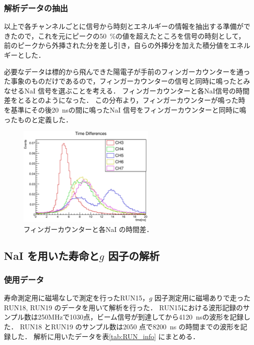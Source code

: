 \subsubsection{解析データの抽出}
以上で各チャンネルごとに信号から時刻とエネルギーの情報を抽出する準備ができたので，これを元にピークの50~\%の値を超えたところを信号の時刻として，前のピークから外挿された分を差し引き，自らの外挿分を加えた積分値をエネルギーとした．

必要なデータは標的から飛んできた陽電子が手前のフィンガーカウンターを通った事象のものだけであるので，フィンガーカウンターの信号と同時に鳴ったとみなせるNaI 信号を選ぶことを考える．
フィンガーカウンターと各NaI信号の時間差をとるとのようになった．
この分布より，フィンガーカウンターが鳴った時を基準にその後20~nsの間に鳴ったNaI 信号をフィンガーカウンターと同時に鳴ったものと定義した．

\begin{figure}[hbt]
\centering
\includegraphics[width=0.6\textwidth]{figure/hatano/coincidence.eps}
\caption{フィンガーカウンターと各NaI の時間差．}
\label{hatano_fig:coincidence}
\end{figure}


\subsection{NaI を用いた寿命と$g$ 因子の解析}
\subsubsection{使用データ}
寿命測定用に磁場なしで測定を行ったRUN15，$g$ 因子測定用に磁場ありで走ったRUN18, RUN19 のデータを用いて解析を行った．
RUN15における波形記録のサンプル数は250MHzで1030点，ビーム信号が到達してから4120~nsの波形を記録した．
RUN18 とRUN19 のサンプル数は2050 点で8200~ns の時間までの波形を記録した．
解析に用いたデータを表\ref{tab:RUN_info} にまとめる．

